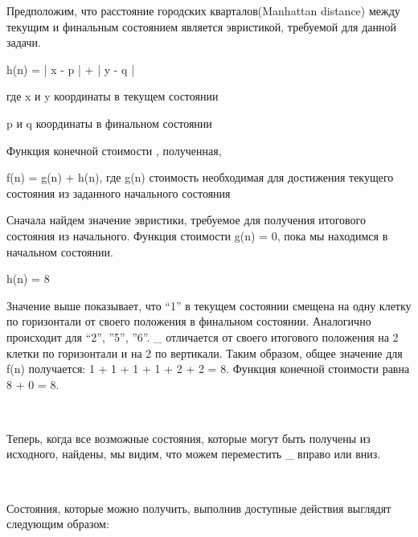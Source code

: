 \begin{tcolorbox}
\color{Purple}{
1 \ 2 \ 3 
	
4 \ 5 \ 6
	
7 \ 8 \ \_}
\end{tcolorbox}


Предположим, что расстояние городских кварталов(Manhattan distance) между текущим и финальным состоянием является эвристикой, требуемой для данной задачи.

\begin{tcolorbox}
    h(n) = | x - p | + | y - q |
\end{tcolorbox}

где x и y координаты в текущем состоянии

\hspace{6mm} p и q координаты в финальном состоянии


Функция конечной стоимости , полученная,

\begin{tcolorbox}
    f(n) = g(n) + h(n), где g(n) стоимость необходимая для достижения текущего состояния из заданного начального состояния
\end{tcolorbox}


Сначала найдем значение эвристики, требуемое для получения итогового состояния из начального. Функция стоимости g(n) = 0, пока мы находимся в начальном состоянии.

\begin{tcolorbox}
    {h(n) = 8}
\end{tcolorbox}

Значение выше показывает, что “1” в текущем состоянии смещена на одну клетку по горизонтали от своего положения в финальном состоянии. Аналогично происходит для “2”, ”5”, ”6”. \_ отличается от своего итогового положения на 2 клетки по горизонтали и на 2 по вертикали. Таким образом, общее значение для f(n) получается: 1 + 1 + 1 + 1 + 2 + 2 = 8. Функция конечной стоимости равна 8 + 0 = 8.

~

Теперь, когда все возможные состояния, которые могут быть получены из исходного, найдены, мы видим, что можем переместить \_ вправо или вниз.

~

Состояния, которые можно получить, выполнив доступные действия выглядят следующим образом:

